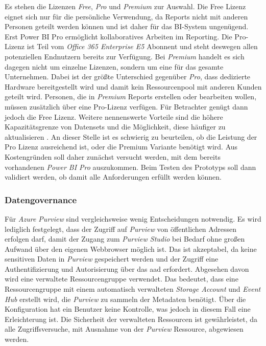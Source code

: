 Es stehen die Lizenzen \textit{Free}, \textit{Pro} und \textit{Premium} zur Auswahl. Die Free Lizenz eignet sich nur für die persönliche Verwendung, da Reports nicht mit anderen Personen geteilt werden können und ist daher für das BI-System ungenügend. Erst Power BI Pro ermöglicht kollaboratives Arbeiten im Reporting. Die Pro-Lizenz ist Teil vom \textit{Office 365 Enterprise E5} Abonnent und steht deswegen allen potenziellen Endnutzern bereits zur Verfügung. Bei \textit{Premium} handelt es sich dagegen nicht um einzelne Lizenzen, sondern um eine für das gesamte Unternehmen. Dabei ist der größte Unterschied gegenüber \textit{Pro}, dass dedizierte Hardware bereitgestellt wird und damit kein Ressourcenpool mit anderen Kunden geteilt wird. Personen, die in \textit{Premium} Reports erstellen oder bearbeiten wollen, müssen zusätzlich über eine Pro-Lizenz verfügen. Für Betrachter genügt dann jedoch die Free Lizenz. Weitere nennenswerte Vorteile sind die höhere Kapazitätsgrenze von Datensets und die Möglichkeit, diese häufiger zu aktualisieren \cite[vgl.][]{gunnarsson_pro_2020}. An dieser Stelle ist es schwierig zu beurteilen, ob die Leistung der Pro Lizenz ausreichend ist, oder die Premium Variante benötigt wird. Aus Kostengründen soll daher zunächst versucht werden, mit dem bereits vorhandenen \textit{Power BI Pro} auszukommen. Beim Testen des Prototyps soll dann validiert werden, ob damit alle Anforderungen erfüllt werden können.

\subsubsection{Datengovernance} \label{subsec:infra:konfig:purview}
Für \textit{Azure Purview} sind vergleichsweise wenig Entscheidungen notwendig. Es wird lediglich festgelegt, dass der Zugriff auf \textit{Purview} von öffentlichen Adressen erfolgen darf, damit der Zugang zum \textit{Purview Studio} bei Bedarf ohne großen Aufwand über den eigenen Webbrowser möglich ist. Das ist akzeptabel, da keine sensitiven Daten in \textit{Purview} gespeichert werden und der Zugriff eine Authentifizierung und Autorisierung über das \ac{aad} erfordert. Abgesehen davon wird eine verwaltete Ressourcengruppe verwendet. Das bedeutet, dass eine Ressourcengruppe mit einem automatisch verwalteten \textit{Storage Account} und \textit{Event Hub} erstellt wird, die \textit{Purview} zu sammeln der Metadaten benötigt. Über die Konfiguration hat ein Benutzer keine Kontrolle, was jedoch in diesem Fall eine Erleichterung ist. Die Sicherheit der verwalteten Ressourcen ist gewährleistet, da alle Zugriffsversuche, mit Ausnahme von der \textit{Purview} Ressource, abgewiesen werden. \cite[vgl.][]{msdoc_22_purviewDeploymentBestPract, msdoc_21_managedApps}

